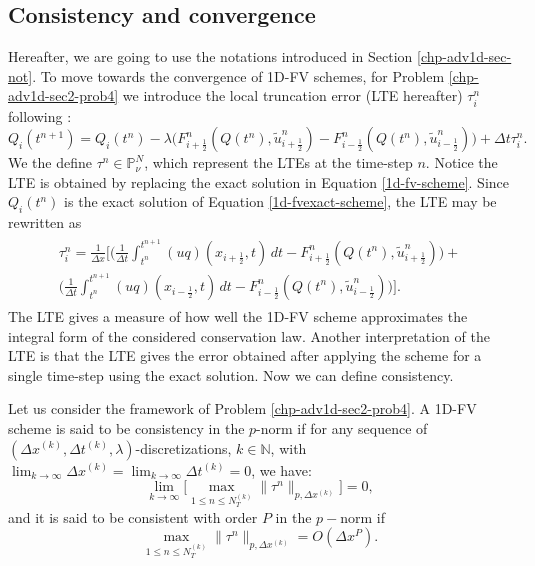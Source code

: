 \subsection{Consistency and convergence}
\label{chp-adv1d-sub-CC}
Hereafter, we are going to use the notations introduced in Section \ref{chp-adv1d-sec-not}.
To move towards the convergence of 1D-FV schemes, for  Problem \ref{chp-adv1d-sec2-prob4} we introduce the local truncation error (LTE hereafter)
$\tau_i^n$ following \citet{leveque:2002}:
\begin{equation}
	\label{consistency-1d-eq1}
	Q_i(t^{n+1}) = Q_i(t^n) - \lambda
	\bigg({F}^n_{i+\frac{1}{2}}(Q(t^n),\tilde{u}^n_{i+\frac{1}{2}})-
	{F}^n_{i-\frac{1}{2}}(Q(t^n),\tilde{u}^n_{i-\frac{1}{2}}) \bigg) + \Delta t \tau_i^n.
\end{equation}
We the define $\tau^n \in \mathbb{P}^{N}_{\nu}$, which represent the LTEs at the time-step $n$.
Notice the LTE is obtained by replacing the exact solution in Equation \eqref{1d-fv-scheme}.
Since $Q_i(t^n)$ is the exact solution of Equation \eqref{1d-fvexact-scheme}, 
the LTE may be rewritten as
\begin{align}
	\begin{split}
		\label{consistency-1d-eq2}
		\tau_{i}^n = 
		\frac{1}{\Delta x} \bigg[  \bigg( \frac{1}{\Delta t}\int_{t^{n}}^{t^{n+1}}
		{(uq)}(x_{i+\frac{1}{2}}, t) \,dt - {F}^n_{i+\frac{1}{2}}(Q(t^n),\tilde{u}^n_{i+\frac{1}{2}}) \bigg) +\\
		\bigg( \frac{1}{\Delta t}\int_{t^{n}}^{t^{n+1}}
		{(uq)}(x_{i-\frac{1}{2}}, t) \,dt - {F}^n_{i-\frac{1}{2}}(Q(t^n),\tilde{u}^n_{i-\frac{1}{2}}) \bigg)
		\bigg].
	\end{split}
\end{align}
The LTE gives a measure of how well the 1D-FV scheme approximates the integral form
of the considered conservation law. 
Another interpretation of the LTE is that the LTE gives the error obtained after applying
the scheme for a single time-step using the exact solution.
Now we can define consistency.
\begin{definition}[Consistency]
	\label{chp-adv1d-def-cons}
	Let us consider the framework of Problem \ref{chp-adv1d-sec2-prob4}.
	A 1D-FV scheme is said to be consistency in the $p$-norm if for any sequence of $(\Delta x^{(k)}, \Delta t^{(k)},\lambda)$-discretizations, 
	$k \in \mathbb{N}$, with $\lim_{k\to \infty }{\Delta x^{(k)}} = \lim_{k\to \infty }{\Delta t^{(k)}} = 0$, we have:
	\begin{equation*}
		\lim_{k \to \infty}\bigg[ {\max_{1\leq n\leq N_T^{(k)}}}{\|\tau^n\|_{p,\Delta x^{(k)}}} \bigg] = 0,
	\end{equation*}
	and it is said to be consistent with order $P$ in the $p-$norm if %
	\begin{equation*}
		{\max_{1\leq n\leq N_T^{(k)}}}{\|\tau^n\|_{p,\Delta x^{(k)}}} = O(\Delta x^P).
	\end{equation*}
\end{definition}
